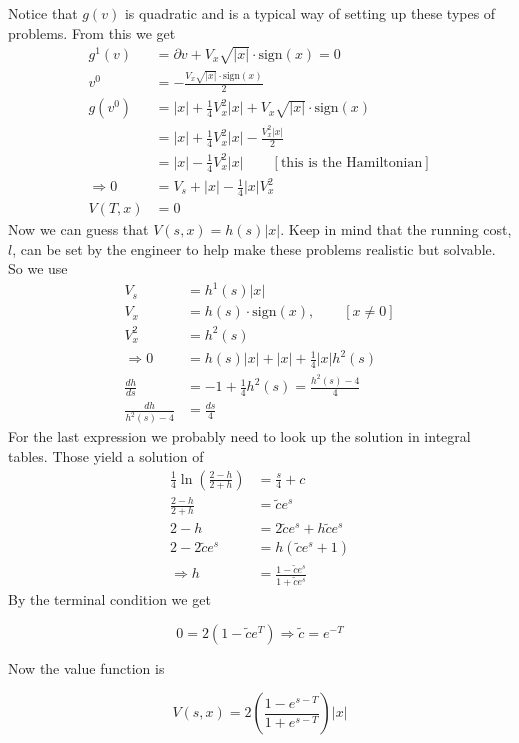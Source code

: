 \begin{example}
Notice that $g(v)$ is quadratic and is a typical way of setting up these types of problems.
From this we get
\begin{align*}
g^1(v) &= \partial v + V_x\sqrt{|x|}\cdot \text{sign}(x) = 0 \\
v^0 &= -\frac{V_x\sqrt{|x|}\cdot\text{sign}(x)}{2} \\
g(v^0) &= |x| + \frac{1}{4}V_x^2|x| + V_x\sqrt{|x|}\cdot\text{sign}(x) \\
&= |x| + \frac{1}{4}V_x^2|x| - \frac{V_x^2|x|}{2} \\
&= |x| - \frac{1}{4}V_x^2|x| \qquad [\text{this is the Hamiltonian}] \\
\Rightarrow 0 &= V_s + |x| - \frac{1}{4}|x|V_x^2 \\
V(T,x) &= 0
\end{align*}
Now we can guess that $V(s,x) = h(s)|x|$.
Keep in mind that the running cost, $l$, can be set by the engineer to help make these problems realistic but solvable.
So we use
\begin{align*}
V_s &= h^1(s)|x| \\
V_x &= h(s)\cdot\text{sign}(x), \qquad [x\neq0] \\
V_x^2 &= h^2(s) \\
\Rightarrow 0 &= h(s)|x| + |x| + \frac{1}{4}|x|h^2(s) \\
\frac{dh}{ds} &= -1 + \frac{1}{4}h^2(s) = \frac{h^2(s)-4}{4} \\
\frac{dh}{h^2(s)-4} &= \frac{ds}{4}
\end{align*}
For the last expression we probably need to look up the solution in integral tables.
Those yield a solution of
\begin{align*}
\frac{1}{4}\ln\left(\frac{2-h}{2+h}\right) &= \frac{s}{4} + c \\
\frac{2-h}{2+h} &= \tilde{c}e^s \\
2-h &= 2\tilde{c}e^s + h\tilde{c}e^s \\
2-2\tilde{c}e^s &= h(\tilde{c}e^s+1) \\
\Rightarrow h &= \frac{1-\tilde{c}e^s}{1+\tilde{c}e^s}
\end{align*}
By the terminal condition we get

\begin{equation*}
0 = 2(1-\tilde{c}e^T) \Rightarrow \tilde{c} = e^{-T}
\end{equation*}

Now the value function is

\begin{equation*}
V(s,x) = 2\left(\frac{1-e^{s-T}}{1+e^{s-T}}\right)|x|
\end{equation*}


\end{example}

